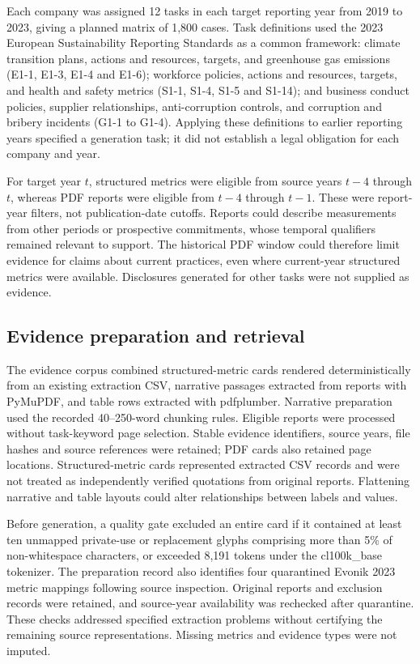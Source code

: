 \documentclass[11pt,a4paper]{article}
\begin{document}
Each company was assigned 12 tasks in each target reporting year from 2019 to 2023, giving a planned matrix of 1,800 cases. Task definitions used the 2023 European Sustainability Reporting Standards as a common framework: climate transition plans, actions and resources, targets, and greenhouse gas emissions (E1-1, E1-3, E1-4 and E1-6); workforce policies, actions and resources, targets, and health and safety metrics (S1-1, S1-4, S1-5 and S1-14); and business conduct policies, supplier relationships, anti-corruption controls, and corruption and bribery incidents (G1-1 to G1-4). Applying these definitions to earlier reporting years specified a generation task; it did not establish a legal obligation for each company and year.

For target year \(t\), structured metrics were eligible from source years \(t-4\) through \(t\), whereas PDF reports were eligible from \(t-4\) through \(t-1\). These were report-year filters, not publication-date cutoffs. Reports could describe measurements from other periods or prospective commitments, whose temporal qualifiers remained relevant to support. The historical PDF window could therefore limit evidence for claims about current practices, even where current-year structured metrics were available. Disclosures generated for other tasks were not supplied as evidence.

\subsection*{Evidence preparation and retrieval}

The evidence corpus combined structured-metric cards rendered deterministically from an existing extraction CSV, narrative passages extracted from reports with PyMuPDF, and table rows extracted with pdfplumber. Narrative preparation used the recorded 40--250-word chunking rules. Eligible reports were processed without task-keyword page selection. Stable evidence identifiers, source years, file hashes and source references were retained; PDF cards also retained page locations. Structured-metric cards represented extracted CSV records and were not treated as independently verified quotations from original reports. Flattening narrative and table layouts could alter relationships between labels and values.

Before generation, a quality gate excluded an entire card if it contained at least ten unmapped private-use or replacement glyphs comprising more than 5\% of non-whitespace characters, or exceeded 8,191 tokens under the cl100k\_base tokenizer. The preparation record also identifies four quarantined Evonik 2023 metric mappings following source inspection. Original reports and exclusion records were retained, and source-year availability was rechecked after quarantine. These checks addressed specified extraction problems without certifying the remaining source representations. Missing metrics and evidence types were not imputed.
\end{document}
